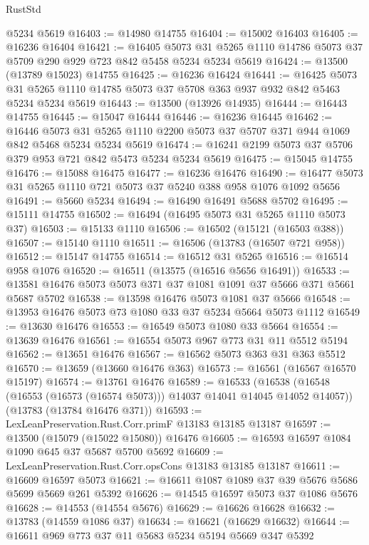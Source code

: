 \begin{lexlean}{RustStd}
\begin{coremodule}
    @5234
    @5619
@16403 := @14980 @14755
@16404 := @15002 @16403
@16405 := @16236 @16404
@16421 := @16405
    @5073
    @31
    @5265
    @1110
    @14786
    @5073
    @37
    @5709
    @290
    @929
    @723
    @842
    @5458
    @5234
    @5234
    @5619
@16424 := @13500 (@13789 @15023) @14755
@16425 := @16236 @16424
@16441 := @16425
    @5073
    @31
    @5265
    @1110
    @14785
    @5073
    @37
    @5708
    @363
    @937
    @932
    @842
    @5463
    @5234
    @5234
    @5619
@16443 := @13500 (@13926 @14935)
@16444 := @16443 @14755
@16445 := @15047 @16444
@16446 := @16236 @16445
@16462 := @16446
    @5073
    @31
    @5265
    @1110
    @2200
    @5073
    @37
    @5707
    @371
    @944
    @1069
    @842
    @5468
    @5234
    @5234
    @5619
@16474 := @16241 @2199 @5073 @37 @5706 @379 @953 @721 @842 @5473 @5234 @5234 @5619
@16475 := @15045 @14755
@16476 := @15088 @16475
@16477 := @16236 @16476
@16490 := @16477 @5073 @31 @5265 @1110 @721 @5073 @37 @5240 @388 @958 @1076 @1092 @5656
@16491 := @5660 @5234
@16494 := @16490 @16491 @5688 @5702
@16495 := @15111 @14755
@16502 := @16494 (@16495 @5073 @31 @5265 @1110 @5073 @37)
@16503 := @15133 @1110
@16506 := @16502 (@15121 (@16503 @388))
@16507 := @15140 @1110
@16511 := @16506 (@13783 (@16507 @721 @958))
@16512 := @15147 @14755
@16514 := @16512 @31 @5265
@16516 := @16514 @958 @1076
@16520 := @16511 (@13575 (@16516 @5656 @16491))
@16533 := @13581 @16476 @5073 @5073 @371 @37 @1081 @1091 @37 @5666 @371 @5661 @5687 @5702
@16538 := @13598 @16476 @5073 @1081 @37 @5666
@16548 := @13953 @16476 @5073 @73 @1080 @33 @37 @5234 @5664 @5073 @1112
@16549 := @13630 @16476
@16553 := @16549 @5073 @1080 @33 @5664
@16554 := @13639 @16476
@16561 := @16554 @5073 @967 @773 @31 @11 @5512 @5194
@16562 := @13651 @16476
@16567 := @16562 @5073 @363 @31 @363 @5512
@16570 := @13659 (@13660 @16476 @363)
@16573 := @16561 (@16567 @16570 @15197)
@16574 := @13761 @16476
@16589 := @16533
    (@16538 (@16548 (@16553 (@16573 (@16574 @5073))) @14037 @14041 @14045 @14052 @14057))
    (@13783 (@13784 @16476 @371))
@16593 := LexLeanPreservation.Rust.Corr.primF @13183 @13185 @13187
@16597 := @13500 (@15079 (@15022 @15080)) @16476
@16605 := @16593 @16597 @1084 @1090 @645 @37 @5687 @5700 @5692
@16609 := LexLeanPreservation.Rust.Corr.opsCons @13183 @13185 @13187
@16611 := @16609 @16597 @5073
@16621 := @16611 @1087 @1089 @37 @39 @5676 @5686 @5699 @5669 @261 @5392
@16626 := @14545 @16597 @5073 @37 @1086 @5676
@16628 := @14553 (@14554 @5676)
@16629 := @16626 @16628
@16632 := @13783 (@14559 @1086 @37)
@16634 := @16621 (@16629 @16632)
@16644 := @16611 @969 @773 @37 @11 @5683 @5234 @5194 @5669 @347 @5392

\end{coremodule}
\end{lexlean}
